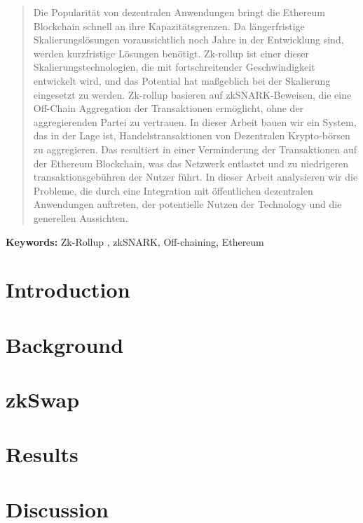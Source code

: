 \documentclass[11pt,a4paper,final]{article}
\begin{document}
    \begin{abstract}
        Die Popularität von dezentralen Anwendungen bringt die Ethereum Blockchain schnell an ihre Kapazitätsgrenzen. Da längerfristige Skalierungslösungen voraussichtlich noch Jahre in der Entwicklung sind, werden kurzfristige Lösungen benötigt. Zk-rollup ist einer dieser Skalierungstechnologien, die mit fortschreitender Geschwindigkeit entwickelt wird, und das Potential hat maßgeblich bei der Skalierung eingesetzt zu werden. Zk-rollup basieren auf zkSNARK-Beweisen, die eine Off-Chain Aggregation der Transaktionen ermöglicht, ohne der aggregierenden Partei zu vertrauen. In dieser Arbeit bauen wir ein System, das in der Lage ist, Handelstransaktionen von Dezentralen Krypto-börsen zu aggregieren. Das resultiert in einer Verminderung der Transaktionen auf der Ethereum Blockchain, was das Netzwerk entlastet und zu niedrigeren transaktionsgebühren der Nutzer führt. In dieser Arbeit analysieren wir die Probleme, die durch eine Integration mit öffentlichen dezentralen Anwendungen auftreten, der potentielle Nutzen der Technology und die generellen Aussichten.
    \end{abstract}
    {\bf Keywords:} Zk-Rollup , zkSNARK, Off-chaining, Ethereum

    \tableofcontents
    \listoffigures
    \section{Introduction}
    

    \section{Background}
    

    \section{zkSwap}
    

    \section{Results}
    

    \section{Discussion}
    
\end{document}

